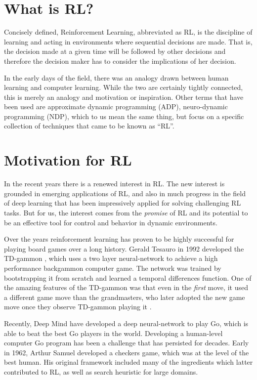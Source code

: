 \section{What is RL?}

Concisely defined, Reinforcement Learning, abbreviated as RL, is the discipline of learning and acting in 
environments where sequential decisions are made. That is, the decision made at a given time 
will be followed by other decisions and therefore the decision maker has to consider the implications 
of her decision.

In the early days of the field, there was an analogy drawn between human learning and computer 
learning. While the two are certainly tightly connected, this is merely an analogy and motivation or inspiration. Other terms that 
have been used are approximate dynamic programming (ADP), neuro-dynamic programming (NDP), which to us
mean the same thing, but focus on a specific collection of techniques that came to be known as ``RL''.


\section{Motivation for RL}

In the recent years there is a renewed interest in RL. The new interest is grounded in  emerging applications
of RL, and also in much progress in the field of deep learning that
has been impressively applied for solving challenging RL tasks. 
But for us, the interest comes from the {\em promise} of RL and its
potential to be an effective tool for control and behavior in dynamic environments.

Over the years reinforcement learning has proven to be highly
successful for playing board games over a long history. Gerald
Tesauro in 1992 developed the TD-gammon \cite{XX}, which uses a two layer
neural-network to achieve a high performance backgammon computer
game. The network was trained by bootstrapping it from scratch and
learned a temporal differences function. One of the amazing features
of the TD-gammon was that even in the {\em first} move, it used a
different game move than the grandmasters, who later adopted the new
game move once they observe TD-gammon playing it \cite{XX}.

Recently, Deep Mind have developed a deep neural-network
to play Go, which is able to beat the best Go players in the world.
Developing a human-level computer Go program has been a challenge
that has persisted for decades.
Early in 1962, Arthur Samuel developed a checkers game, which was at
the level of the best human. His original framework included many of
the ingredients which latter contributed to RL,
as well as search heuristic for large domains.


